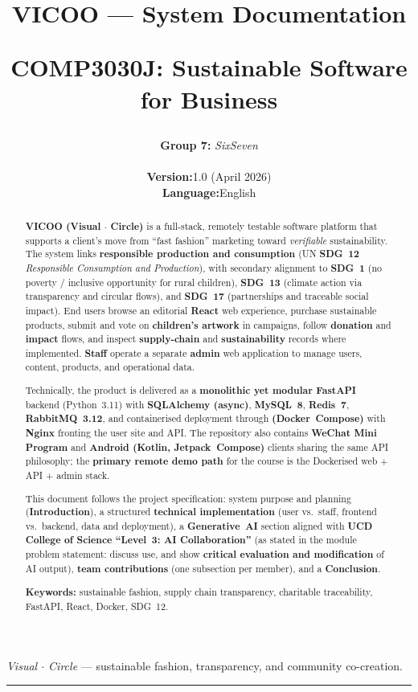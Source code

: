 \documentclass[11pt,a4paper]{article}
\title{%
  \vspace{-1.2em}
  {\Large\sffamily\bfseries VICOO --- System Documentation\par}
  \vspace{0.4em}
  {\large\mdseries COMP3030J: Sustainable Software for Business\par}
}
\author{%
  \normalsize
  \textbf{Group 7:} \textit{SixSeven}\\[0.35em]
  \small
  \begin{tabular}{rl}
    \textbf{Version:}    & 1.0 (April 2026) \\
    \textbf{Language:}   & English
  \end{tabular}
}
\date{}
\begin{document}
\maketitle
\thispagestyle{empty}
\vspace{-0.8em}
\begin{center}
  \small\emph{Visual $\cdot$ Circle} --- sustainable fashion, transparency, and community co-creation.
\end{center}
\vspace{0.8em}
\hrule
\vspace{0.8em}

\tableofcontents
\newpage

\begin{abstract}
\noindent
\textbf{VICOO (Visual $\cdot$ Circle)} is a full-stack, remotely testable software platform that supports a client's move from ``fast fashion'' marketing toward \emph{verifiable} sustainability. The system links \textbf{responsible production and consumption} (UN \textbf{SDG~12} \emph{Responsible Consumption and Production}), with secondary alignment to \textbf{SDG~1} (no poverty / inclusive opportunity for rural children), \textbf{SDG~13} (climate action via transparency and circular flows), and \textbf{SDG~17} (partnerships and traceable social impact). End users browse an editorial \textbf{React} web experience, purchase sustainable products, submit and vote on \textbf{children's artwork} in campaigns, follow \textbf{donation} and \textbf{impact} flows, and inspect \textbf{supply-chain} and \textbf{sustainability} records where implemented. \textbf{Staff} operate a separate \textbf{admin} web application to manage users, content, products, and operational data.

\medskip
\noindent
Technically, the product is delivered as a \textbf{monolithic yet modular FastAPI} backend (Python~3.11) with \textbf{SQLAlchemy (async)}, \textbf{MySQL~8}, \textbf{Redis~7}, \textbf{RabbitMQ~3.12}, and containerised deployment through  \textbf{(Docker~Compose)} with \textbf{Nginx} fronting the user site and API. The repository also contains \textbf{WeChat Mini Program} and \textbf{Android (Kotlin, Jetpack~Compose)} clients sharing the same API philosophy; the \textbf{primary remote demo path} for the course is the Dockerised web + API + admin stack.

\medskip
\noindent
This document follows the project specification: system purpose and planning (\textbf{Introduction}), a structured \textbf{technical implementation} (user vs.\ staff, frontend vs.\ backend, data and deployment), a \textbf{Generative~AI} section aligned with \textbf{UCD College of Science ``Level~3: AI Collaboration''} (as stated in the module problem statement: discuss use, and show \textbf{critical evaluation and modification} of AI output), \textbf{team contributions} (one subsection per member), and a \textbf{Conclusion}.

\medskip
\noindent
\textbf{Keywords:} sustainable fashion, supply chain transparency, charitable traceability, FastAPI, React, Docker, SDG~12.
\end{abstract}
\end{document}
